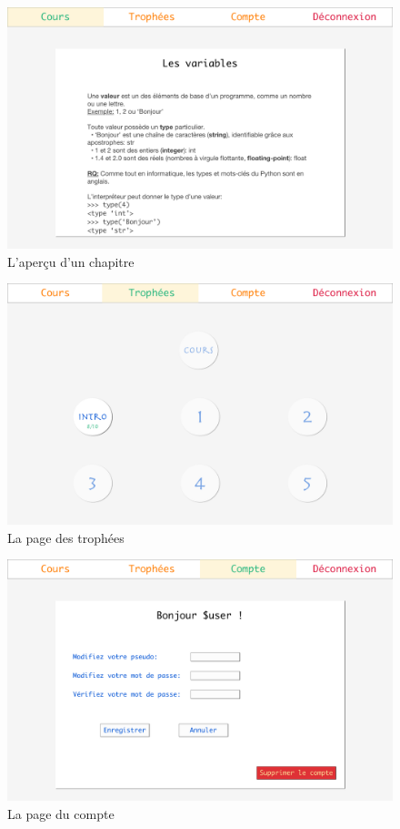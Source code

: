 \begin{figure}[!h]
    \centering
    \includegraphics[scale=0.14]{textures/images/annexes/maquettes/22-Cours.png}
    \caption{L'aperçu d'un chapitre}
\end{figure}
\begin{figure}[!h]
    \centering
    \includegraphics[scale=0.14]{textures/images/annexes/maquettes/3-Trophees.png}
    \caption{La page des trophées}
\end{figure}

\newpage

\begin{figure}[!h]
    \centering
    \includegraphics[scale=0.14]{textures/images/annexes/maquettes/4-Compte.png}
    \caption{La page du compte}
\end{figure}